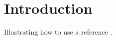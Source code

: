 \documentclass{article}
\begin{document}


	\thispagestyle{nofooter}

	
	\typeout{}

\pagebreak


\setcounter{page}{1}

\section{Introduction}
\label{sec:Introduction}

Illustrating how to use a reference \citep{dummy_2020}.

\pagebreak



\end{document}

